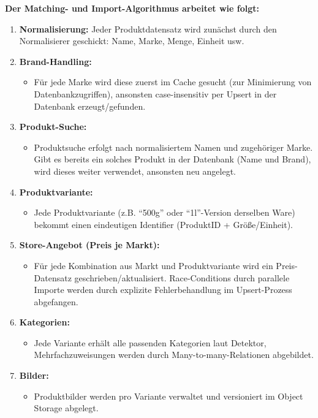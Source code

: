 \documentclass[12pt, a4paper]{report} %
\begin{document}
\textbf{Der Matching- und Import-Algorithmus arbeitet wie folgt:}
\begin{enumerate}
    \item \textbf{Normalisierung:} Jeder Produktdatensatz wird zunächst durch den Normalisierer geschickt: Name, Marke, Menge, Einheit usw.
    \item \textbf{Brand-Handling:}
        \begin{itemize}
            \item Für jede Marke wird diese zuerst im Cache gesucht (zur Minimierung von Datenbankzugriffen), ansonsten case-insensitiv per Upsert in der Datenbank erzeugt/gefunden.
        \end{itemize}
    \item \textbf{Produkt-Suche:}
        \begin{itemize}
            \item Produktsuche erfolgt nach normalisiertem Namen und zugehöriger Marke. Gibt es bereits ein solches Produkt in der Datenbank (Name und Brand), wird dieses weiter verwendet, ansonsten neu angelegt.
        \end{itemize}
    \item \textbf{Produktvariante:}
        \begin{itemize}
            \item Jede Produktvariante (z.B. "`500g"' oder "`1l"'-Version derselben Ware) bekommt einen eindeutigen Identifier (ProduktID + Größe/Einheit).
        \end{itemize}
    \item \textbf{Store-Angebot (Preis je Markt):}
        \begin{itemize}
            \item Für jede Kombination aus Markt und Produktvariante wird ein Preis-Datensatz geschrieben/aktualisiert. Race-Conditions durch parallele Importe werden durch explizite Fehlerbehandlung im Upsert-Prozess abgefangen.
        \end{itemize}
    \item \textbf{Kategorien:}
        \begin{itemize}
            \item Jede Variante erhält alle passenden Kategorien laut Detektor, Mehrfachzuweisungen werden durch Many-to-many-Relationen abgebildet.
        \end{itemize}
    \item \textbf{Bilder:}
        \begin{itemize}
            \item Produktbilder werden pro Variante verwaltet und versioniert im Object Storage abgelegt.
        \end{itemize}
\end{enumerate}
\end{document}
